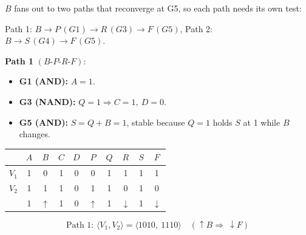 \documentclass[a4paper, 10pt]{article}
\begin{document}
\begin{solution}
	\noindent \( B \) fans out to two paths that reconverge at G5, so each path needs its own test:
	\begin{center}
		Path 1: \( B \to P\,(G1) \to R\,(G3) \to F\,(G5) \), \qquad
		Path 2: \( B \to S\,(G4) \to F\,(G5) \).
	\end{center}

	\noindent\textbf{Path 1} \( (B\text{-}P\text{-}R\text{-}F) \):
	\begin{itemize}
		\item \textbf{G1 (AND):} \( A = 1 \).
		\item \textbf{G3 (NAND):} \( Q = 1 \Rightarrow C = 1,\ D = 0 \).
		\item \textbf{G5 (AND):} \( S = Q + B = 1 \), stable because \( Q = 1 \) holds \( S \) at 1 while \( B \) changes.
	\end{itemize}
	\begin{center}
		\begin{tabular}{c|cccc|cccc|c}
			\toprule
			          & \( A \) & \( B \)        & \( C \) & \( D \) & \( P \)        & \( Q \) & \( R \)          & \( S \) & \( F \)          \\
			\midrule
			\( V_1 \) & 1       & 0              & 1       & 0       & 0              & 1       & 1                & 1       & 1                \\
			\( V_2 \) & 1       & 1              & 1       & 0       & 1              & 1       & 0                & 1       & 0                \\
			\midrule
			          & 1       & \( \uparrow \) & 1       & 0       & \( \uparrow \) & 1       & \( \downarrow \) & 1       & \( \downarrow \) \\
			\bottomrule
		\end{tabular}
	\end{center}
	\[ \boxed{\text{Path 1: } \langle V_1, V_2 \rangle = \langle 1010,\ 1110 \rangle} \quad (\uparrow B \Rightarrow\ \downarrow F) \]


\end{solution}
\end{document}
